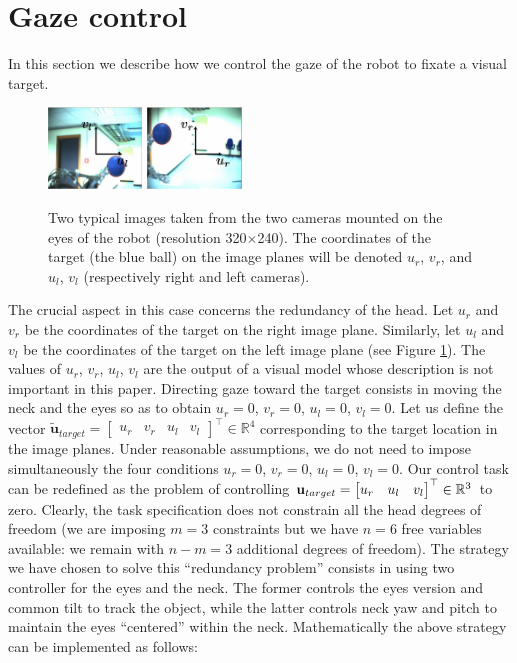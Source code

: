 \section{Gaze control}
\label{Sec:gazecontrol}

In this section we describe how we control the gaze of the robot to
fixate a visual target.

\begin{figure}[tbp]
\centering
\includegraphics[width=25mm]{Figure/LeftImage.eps} \hspace{1cm}
\includegraphics[width=25mm]{Figure/RightImage.eps}
\caption{Two typical images taken from the two cameras mounted on the 
eyes of the robot (resolution 320$\times$240). 
The coordinates of the target (the blue ball) on the image planes
will be denoted $u_r$, $v_r$, and $u_l$, $v_l$ (respectively right 
and left cameras).}
\label{Fig:ImagePlane}
\end{figure}
 
The crucial aspect in this case concerns the redundancy of the 
head. Let $u_r$ and $v_r$ be the coordinates of the target on the 
right image plane. Similarly, let $u_l$ and $v_l$ be the coordinates 
of the target on the 
left image plane (see Figure \ref{Fig:ImagePlane}). The values of $u_r$, 
$v_r$, $u_l$, $v_l$ are the output of a visual model whose description 
is not important in this paper. Directing gaze toward the target 
consists in moving the neck and the eyes so as to obtain 
$u_r=0$, $v_r=0$, $u_l=0$, $v_l=0$. 
Let us define the vector 
$\tilde {\mathbf u}_{target}= \begin{bmatrix} u_r & v_r & u_l & v_l 
\end{bmatrix}^\top \in \mathbb R^4$ corresponding to the 
target location in the image planes. Under reasonable 
assumptions, we do not need to impose simultaneously 
the four conditions $u_r=0$, $v_r=0$, $u_l=0$, $v_l=0$.  Our control task 
can be redefined as the problem of controlling 
$\mathbf{u}_{target} = \begin{bmatrix} u_r & u_l & v_l \end{bmatrix}^\top \in \mathbb R^3$ 
to zero. Clearly, the task specification does not constrain all the head degrees of 
freedom (we are imposing $m=3$ constraints but we have $n=6$ free variables 
available: we remain with $n-m=3$ additional degrees of freedom). 
The strategy we have chosen to solve this ``redundancy problem'' consists in 
using two controller for the eyes and the neck. The former controls 
the eyes version and common tilt to track the object, while the latter
controls neck yaw and pitch to maintain the eyes ``centered'' within 
the neck. Mathematically the above strategy can be implemented 
as follows:


